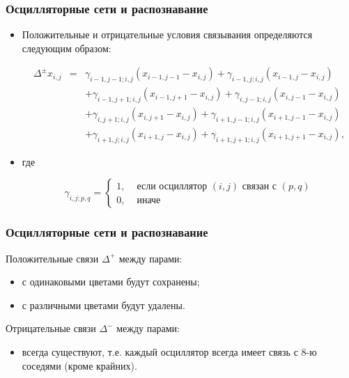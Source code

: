 \documentclass{beamer}
\begin{document}

\begin{frame}
\frametitle{Осцилляторные сети и распознавание}

\begin{itemize}
\item[]Положительные и отрицательные условия связывания определяются следующим образом:
\begin{center}
\begin{eqnarray*}
\Delta^{\pm}x_{i,j} &=& \gamma_{i-1,j-1;i,j}(x_{i-1,j-1}-x_{i,j}) + \gamma_{i-1,j;i,j}(x_{i-1,j}-x_{i,j}) \\
                   && + \gamma_{i-1,j+1;i,j}(x_{i-1,j+1}-x_{i,j}) + \gamma_{i,j-1;i,j}(x_{i,j-1}-x_{i,j}) \\
                   && + \gamma_{i,j+1;i,j}(x_{i,j+1}-x_{i,j}) + \gamma_{i+1,j-1;i,j}(x_{i+1,j-1}-x_{i,j}) \\
                   && + \gamma_{i+1,j;i,j}(x_{i+1,j}-x_{i,j}) + \gamma_{i+1,j+1;i,j}(x_{i+1,j+1}-x_{i,j}),
\end{eqnarray*}
\end{center}
\item[] где
\begin{center}
	$$
	\gamma_{i,j;p,q} = \left\{ \begin{array}{rl}
	 1, &\mbox{ если осциллятор $(i,j)$ связан с $(p,q)$} \\
	 0, &\mbox{ иначе}
	       \end{array} \right.
	$$
\end{center}

\end{itemize}

\end{frame}


\begin{frame}
\frametitle{Осцилляторные сети и распознавание}

Положительные связи $\Delta^{+}$ между парами:
\begin{itemize}
\item с одинаковыми цветами будут сохранены;
\item с различными цветами будут удалены.
\end{itemize}
\bigskip

Отрицательные связи $\Delta^{-}$ между парами:
\begin{itemize}
\item всегда существуют, т.е. каждый осциллятор всегда имеет связь с 8-ю соседями (кроме крайних).
\end{itemize}


\end{frame}
\end{document}
